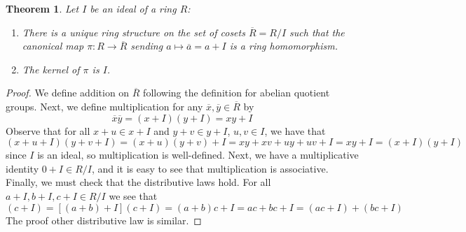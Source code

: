 \documentclass[12pt]{article}
\newtheorem{thm}{Theorem}[section]
\theoremstyle{definition}
\theoremstyle{remark}
\numberwithin{equation}{section}
\begin{document}
\begin{thm}
        Let $I$ be an ideal of a ring $R$:\begin{enumerate}
                \item There is a unique ring structure on the set of cosets $\overline{R} = R/I$ such that the canonical map $\pi:R\rightarrow \overline{R}$ sending $a\mapsto \overline{a} = a +  I$ is a ring homomorphism.
                \item The kernel of $\pi$ is $I$.
        \end{enumerate}
\end{thm}
\begin{proof}
        We define addition on $\overline{R}$ following the definition for abelian quotient groups. Next, we define multiplication for any $\overline{x},\overline{y} \in \overline{R}$ by \begin{equation}
                \overline{x}\overline{y} = (x+I)(y+I) = xy+I
        \end{equation}
        Observe that for all $x+u \in x+I$ and $y+v \in y+I$, $u,v \in I$, we have that \begin{equation}
                (x+u+I)(y+v+I)=(x+u)(y+v)+I = xy+xv+uy+uv + I = xy + I = (x+I)(y+I)
        \end{equation}
        since $I$ is an ideal, so multiplication is well-defined. Next, we have a multiplicative identity $0+I \in R/I$, and it is easy to see that multiplication is associative. Finally, we must check that the distributive laws hold. For all $a+I,b+I,c+I \in R/I$ we see that \begin{equation}
                [(a+I)+(b+I)](c+I) = [(a+b)+I](c+I)=(a+b)c + I = ac+bc+I = (ac+I)+(bc+I)
        \end{equation}
        The proof other distributive law is similar.
\end{proof}

\vspace{15pt}
\end{document}
